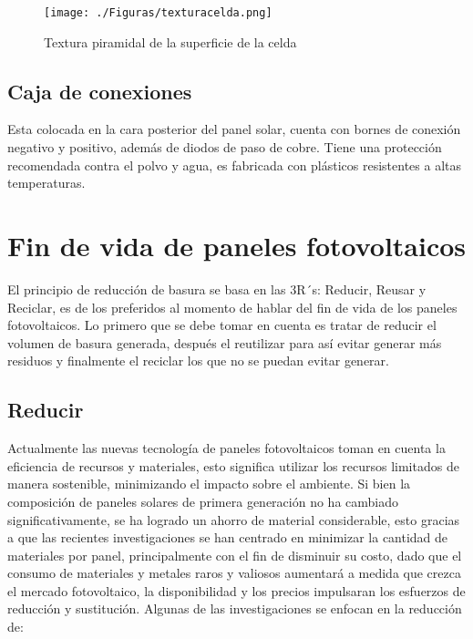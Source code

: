   \begin{figure}[htb]
	\begin{center}
		\texttt{[image: ./Figuras/texturacelda.png]}
	\end{center}
	\vspace{-1em} %
	\caption{Textura piramidal de la superficie de la celda \citep{Yasuhiro2011}}
	\label{fig:textura}
\end{figure}

 \subsection{Caja de conexiones}
\label{sec:caja de conexiones}

Esta colocada en la cara posterior del panel solar, cuenta con bornes de conexión negativo y positivo, además de diodos de paso de cobre. Tiene una protección recomendada contra el polvo y agua, es fabricada con plásticos resistentes a altas temperaturas. 

\section{Fin de vida de paneles fotovoltaicos}
\label{sec:fin de vida}

El principio de reducción de basura se basa en las 3R´s: Reducir, Reusar y Reciclar, es de los preferidos al momento de hablar del fin de vida de los paneles fotovoltaicos. Lo primero que se debe tomar en cuenta es tratar de reducir el volumen de basura generada, después el reutilizar para así evitar generar más residuos y finalmente el reciclar los que no se puedan evitar generar. 

 \subsection{Reducir}
\label{sec:reducir}
Actualmente las nuevas tecnología de paneles fotovoltaicos toman en cuenta la eficiencia de recursos y materiales, esto significa utilizar los recursos limitados de manera sostenible, minimizando el impacto sobre el ambiente. Si bien la composición de paneles solares de primera generación no ha cambiado significativamente, se ha logrado un ahorro de material considerable, esto gracias a que las recientes investigaciones se han centrado en minimizar la cantidad de materiales por panel, principalmente con el fin de disminuir su costo, dado que el consumo de materiales y metales raros y valiosos aumentará a medida que crezca el mercado fotovoltaico, la disponibilidad y los precios impulsaran los esfuerzos de reducción y sustitución. Algunas de las investigaciones se enfocan en la reducción de:

